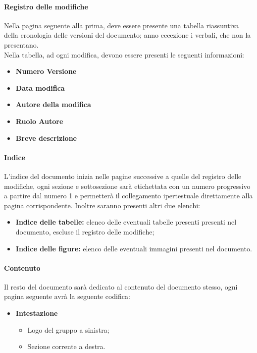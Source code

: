 \documentclass[11pt,a4paper]{article}
\begin{document}
{	\paragraph{Registro delle modifiche\\}
	Nella pagina seguente alla prima, deve essere presente una tabella riassuntiva della cronologia delle versioni del documento; anno eccezione i verbali, che non la presentano. \\
	Nella tabella, ad ogni modifica, devono essere presenti le seguenti informazioni:
	
	\begin{itemize}
		\item \textbf{Numero Versione}
		\item \textbf{Data modifica}
		\item \textbf{Autore della modifica}
		\item \textbf{Ruolo Autore}
		\item \textbf{Breve descrizione}
	\end{itemize}
	
	\paragraph{Indice\\}
	L'indice del documento inizia nelle pagine successive a quelle del registro delle modifiche, ogni sezione e sottosezione sarà etichettata con un numero progressivo a partire dal numero 1 e permetterà il collegamento ipertestuale direttamente alla pagina corrispondente. Inoltre saranno presenti altri due elenchi:
	
	\begin{itemize}
		\item \textbf{Indice delle tabelle:} elenco delle eventuali tabelle presenti presenti nel documento, escluse il registro delle modifiche;
		\item  \textbf{Indice delle figure:} elenco delle eventuali immagini presenti nel documento. 
	\end{itemize}
	
	\paragraph{Contenuto\\}
	Il resto del documento sarà dedicato al contenuto del documento stesso, ogni pagina seguente avrà la seguente codifica:
	\begin{itemize}
		\item \textbf{Intestazione}
		\begin{itemize}
			\item Logo del gruppo a sinistra;
			\item Sezione corrente a destra.
		\end{itemize}
		

\end{itemize}}
\end{document}
